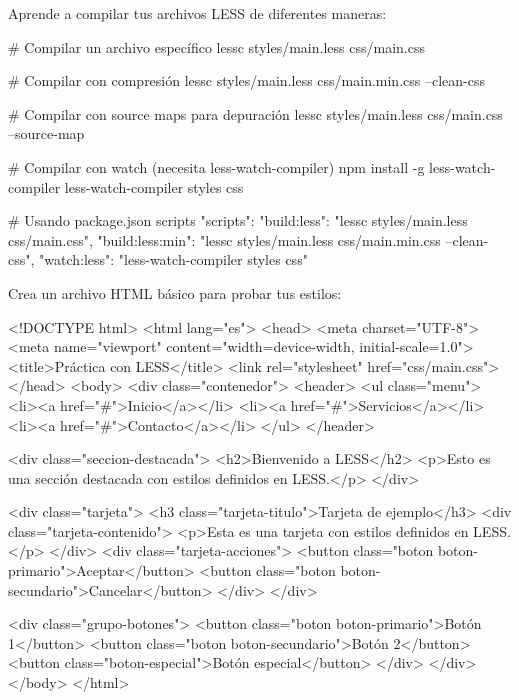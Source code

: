 \documentclass[12pt, a4paper]{article}
\begin{document}
Aprende a compilar tus archivos LESS de diferentes maneras:

\begin{codebox}[title=Compilación por línea de comandos]
# Compilar un archivo específico
lessc styles/main.less css/main.css

# Compilar con compresión
lessc styles/main.less css/main.min.css --clean-css

# Compilar con source maps para depuración
lessc styles/main.less css/main.css --source-map

# Compilar con watch (necesita less-watch-compiler)
npm install -g less-watch-compiler
less-watch-compiler styles css

# Usando package.json scripts
{
  "scripts": {
    "build:less": "lessc styles/main.less css/main.css",
    "build:less:min": "lessc styles/main.less css/main.min.css --clean-css",
    "watch:less": "less-watch-compiler styles css"
  }
}
\end{codebox}

Crea un archivo HTML básico para probar tus estilos:

\begin{codebox}[title=index.html]
<!DOCTYPE html>
<html lang="es">
<head>
  <meta charset="UTF-8">
  <meta name="viewport" content="width=device-width, initial-scale=1.0">
  <title>Práctica con LESS</title>
  <link rel="stylesheet" href="css/main.css">
</head>
<body>
  <div class="contenedor">
    <header>
      <ul class="menu">
        <li><a href="#">Inicio</a></li>
        <li><a href="#">Servicios</a></li>
        <li><a href="#">Contacto</a></li>
      </ul>
    </header>
    
    <div class="seccion-destacada">
      <h2>Bienvenido a LESS</h2>
      <p>Esto es una sección destacada con estilos definidos en LESS.</p>
    </div>
    
    <div class="tarjeta">
      <h3 class="tarjeta-titulo">Tarjeta de ejemplo</h3>
      <div class="tarjeta-contenido">
        <p>Esta es una tarjeta con estilos definidos en LESS.</p>
      </div>
      <div class="tarjeta-acciones">
        <button class="boton boton-primario">Aceptar</button>
        <button class="boton boton-secundario">Cancelar</button>
      </div>
    </div>
    
    <div class="grupo-botones">
      <button class="boton boton-primario">Botón 1</button>
      <button class="boton boton-secundario">Botón 2</button>
      <button class="boton-especial">Botón especial</button>
    </div>
  </div>
</body>
</html>
\end{codebox}
\end{document}
